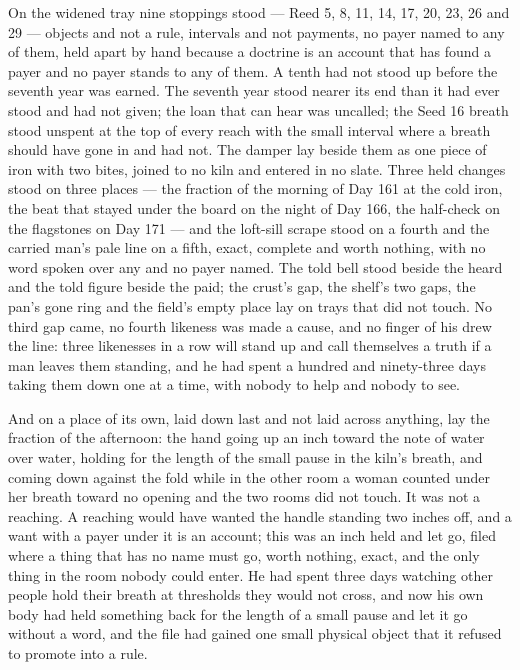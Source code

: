 On the widened tray nine stoppings stood --- Reed 5, 8, 11, 14, 17, 20, 23, 26 and 29 --- objects and not a rule, intervals and not payments, no payer named to any of them, held apart by hand because a doctrine is an account that has found a payer and no payer stands to any of them. A tenth had not stood up before the seventh year was earned. The seventh year stood nearer its end than it had ever stood and had not given; the loan that can hear was uncalled; the Seed 16 breath stood unspent at the top of every reach with the small interval where a breath should have gone in and had not. The damper lay beside them as one piece of iron with two bites, joined to no kiln and entered in no slate. Three held changes stood on three places --- the fraction of the morning of Day 161 at the cold iron, the beat that stayed under the board on the night of Day 166, the half-check on the flagstones on Day 171 --- and the loft-sill scrape stood on a fourth and the carried man's pale line on a fifth, exact, complete and worth nothing, with no word spoken over any and no payer named. The told bell stood beside the heard and the told figure beside the paid; the crust's gap, the shelf's two gaps, the pan's gone ring and the field's empty place lay on trays that did not touch. No third gap came, no fourth likeness was made a cause, and no finger of his drew the line: three likenesses in a row will stand up and call themselves a truth if a man leaves them standing, and he had spent a hundred and ninety-three days taking them down one at a time, with nobody to help and nobody to see.

And on a place of its own, laid down last and not laid across anything, lay the fraction of the afternoon: the hand going up an inch toward the note of water over water, holding for the length of the small pause in the kiln's breath, and coming down against the fold while in the other room a woman counted under her breath toward no opening and the two rooms did not touch. It was not a reaching. A reaching would have wanted the handle standing two inches off, and a want with a payer under it is an account; this was an inch held and let go, filed where a thing that has no name must go, worth nothing, exact, and the only thing in the room nobody could enter. He had spent three days watching other people hold their breath at thresholds they would not cross, and now his own body had held something back for the length of a small pause and let it go without a word, and the file had gained one small physical object that it refused to promote into a rule.

